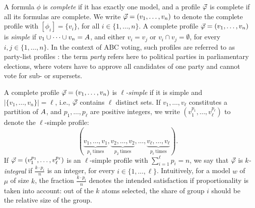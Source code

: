 A formula $\phi$ is \emph{complete} if it has exactly one model, 
and a profile $\P$ is complete if all its formulas are complete.
We write $\P=(v_1,\dots,v_n)$ to denote the complete profile with 
$[\phi_i]=\{v_i\}$, for all $i\in \{1,\dots,n\}$. 
A complete profile $\P=(v_1,\dots,v_n)$ is \emph{simple}
if $v_1\cup\cdots\cup v_n=\Atoms$, and either $v_i=v_j$ or $v_i\cap v_j=\emptyset$, for every $i,j\in\{1,\dots,n\}$.%
In the context of ABC voting, such profiles are referred to as party-list profiles \cite{LacknerS18b}:
the term \emph{party} refers here to political parties in parliamentary elections, 
where voters have to approve all candidates of one party and cannot vote for sub- or supersets.

A complete profile $\P=(v_1,\dots,v_n)$ is \emph{$\ell$-simple} if it is simple and 
$|\{v_1,\dots,v_n\}|=\ell$, i.e., $\P$ contains $\ell$ distinct sets.
If $v_1,\dots,v_\ell$ constitutes a partition of $\Atoms$, 
and $p_1,\dots,p_\ell$ are positive integers,
we write $(v_1^{p_1},\dots,v_\ell^{p_\ell})$ to denote the $\ell$-simple profile:
$$
(
\underbrace{v_1,\dots,v_1}_{p_1~\text{times}},
\underbrace{v_2,\dots,v_2}_{p_2~\text{times}},
\dots,
\underbrace{v_\ell,\dots,v_\ell}_{p_\ell~\text{times}}
).
$$
If $\P=(v_1^{p_1},\dots,v_\ell^{p_\ell})$ is an $\ell$-simple profile with $\sum_{i=1}^\ell p_i=n$,
we say that $\P$ is \emph{$k$-integral} if $\frac{k\cdot p_i}{n}$ is an integer, 
for every $i\in\{1,\dots,\ell\}$.
Intuitively, for a model $w$ of $\mu$ of size $k$, the fraction $\frac{k\cdot p_i}{n}$ denotes the intended satisfaction if proportionality is taken into account: out of the $k$ atoms selected, the share of group $i$ should be the relative size of the group. %

